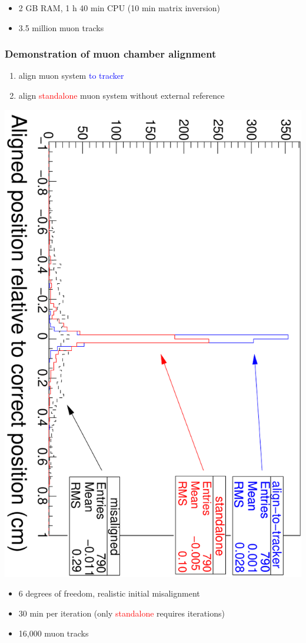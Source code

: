 \documentclass[compress]{beamer}
\begin{document}
\begin{frame}
\begin{itemize}
\vspace{-0.5 cm}
\item 2 GB RAM, 1 h 40 min CPU (10 min matrix inversion)
\item 3.5 million muon tracks
\end{itemize}
\end{frame}

\begin{frame}
\frametitle{Demonstration of muon chamber alignment}
\begin{enumerate}
\item align muon system \textcolor{blue}{to tracker}
\item align \textcolor{red}{standalone} muon system without external reference
\end{enumerate}
\begin{center}
\includegraphics[height=0.6\linewidth, angle=90]{x_positions}
\end{center}
\begin{itemize}
\item 6 degrees of freedom, realistic initial misalignment
\item 30 min per iteration (only \textcolor{red}{standalone} requires iterations)
\item 16,000 muon tracks
\end{itemize}
\end{frame}
\end{document}
